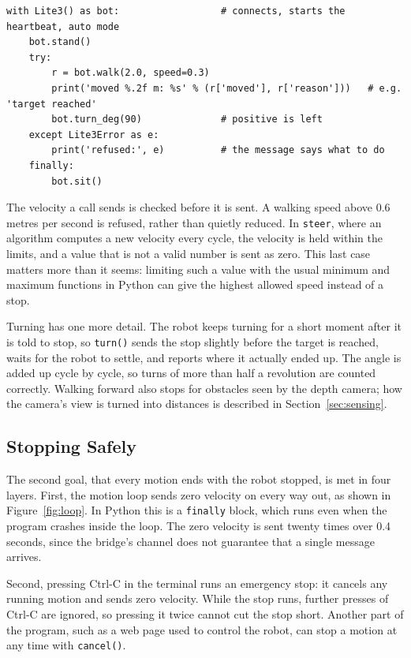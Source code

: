 \begin{lstlisting}[float=htbp, captionpos=b, label=lst:walk,
  caption={A program using the interface. Stopping short is reported, not raised; a refusal to start is raised.}]
with Lite3() as bot:                  # connects, starts the heartbeat, auto mode
    bot.stand()
    try:
        r = bot.walk(2.0, speed=0.3)
        print('moved %.2f m: %s' % (r['moved'], r['reason']))   # e.g. 'target reached'
        bot.turn_deg(90)              # positive is left
    except Lite3Error as e:
        print('refused:', e)          # the message says what to do
    finally:
        bot.sit()
\end{lstlisting}

The velocity a call sends is checked before it is sent. A walking speed above 0.6 metres per second is
refused, rather than quietly reduced. In \texttt{steer}, where an algorithm computes a new velocity every
cycle, the velocity is held within the limits, and a value that is not a valid number is sent as zero. This
last case matters more than it seems: limiting such a value with the usual minimum and maximum functions in
Python can give the highest allowed speed instead of a stop.

Turning has one more detail. The robot keeps turning for a short moment after it is told to stop, so
\texttt{turn()} sends the stop slightly before the target is reached, waits for the robot to settle, and
reports where it actually ended up. The angle is added up cycle by cycle, so turns of more than half a
revolution are counted correctly. Walking forward also stops for obstacles seen by the depth camera; how the
camera's view is turned into distances is described in Section~\ref{sec:sensing}.

\subsection{Stopping Safely}
\label{sec:stopping}

The second goal, that every motion ends with the robot stopped, is met in four layers. First, the motion
loop sends zero velocity on every way out, as shown in Figure~\ref{fig:loop}. In Python this is a
\texttt{finally} block, which runs even when the program crashes inside the loop. The zero velocity is sent
twenty times over 0.4 seconds, since the bridge's channel does not guarantee that a single message arrives.

Second, pressing Ctrl-C in the terminal runs an emergency stop: it cancels any running motion and sends
zero velocity. While the stop runs, further presses of Ctrl-C are ignored, so pressing it twice cannot cut
the stop short. Another part of the program, such as a web page used to control the robot, can stop a
motion at any time with \texttt{cancel()}.

